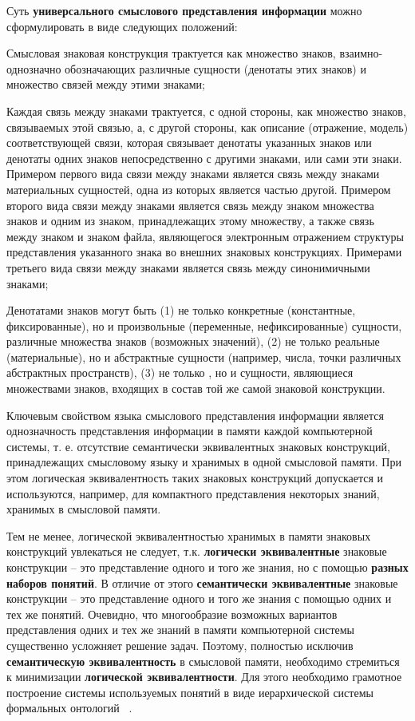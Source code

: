 \begin{SCn}
{Суть \textbf{универсального смыслового представления информации} можно сформулировать в виде следующих положений:
\begin{scnitemize}
    \item Смысловая знаковая конструкция трактуется как множество знаков, взаимно-однозначно обозначающих различные сущности (денотаты этих знаков) и множество связей между этими знаками;
    \item Каждая связь между знаками трактуется, с одной стороны, как множество знаков, связываемых этой связью, а, с другой стороны, как описание (отражение, модель) соответствующей связи, которая связывает денотаты указанных знаков или денотаты одних знаков непосредственно с другими знаками, или сами эти знаки. Примером первого вида связи между знаками является связь между знаками материальных сущностей, одна из которых является частью другой. Примером второго вида связи между знаками является связь между знаком множества знаков и одним из знаком, принадлежащих этому множеству, а также связь между знаком и знаком файла, являющегося электронным отражением структуры представления указанного знака во внешних знаковых конструкциях. Примерами третьего вида связи между знаками является связь между синонимичными знаками;
    \item Денотатами знаков могут быть (1) не только конкретные (константные, фиксированные), но и произвольные (переменные, нефиксированные) сущности,  различные множества знаков (возможных значений), 
    (2) не только реальные (материальные), но и абстрактные сущности (например, числа, точки различных абстрактных пространств), 
    (3) не только , но и  сущности, являющиеся множествами знаков, входящих в состав той же самой знаковой конструкции.
\end{scnitemize}

Ключевым свойством языка смыслового представления информации является однозначность представления информации в памяти каждой компьютерной системы, т. е. отсутствие семантически эквивалентных знаковых конструкций, принадлежащих смысловому языку и хранимых в одной смысловой памяти. При этом логическая эквивалентность таких знаковых конструкций допускается и используются, например, для компактного представления некоторых знаний, хранимых в смысловой памяти.

Тем не менее, логической эквивалентностью хранимых в памяти знаковых конструкций увлекаться не следует, т.к. \textbf{логически эквивалентные} знаковые конструкции -- это представление одного и того же знания, но с помощью \textbf{разных наборов понятий}. В отличие от этого \textbf{семантически эквивалентные} знаковые конструкции -- это представление одного и того же знания с помощью одних и тех же понятий. Очевидно, что многообразие возможных вариантов представления одних и тех же знаний в памяти компьютерной системы существенно усложняет решение задач. Поэтому, полностью исключив \textbf{семантическую эквивалентность} в смысловой памяти, необходимо стремиться к минимизации \textbf{логической эквивалентности}. Для этого необходимо грамотное построение системы используемых понятий в виде иерархической системы формальных онтологий ~\cite{Davydenko2018}.

}
\end{SCn}
